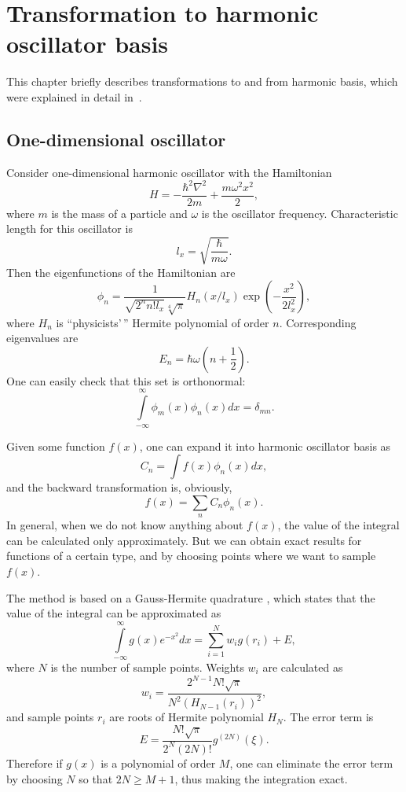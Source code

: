 \chapter{Transformation to harmonic oscillator basis}
\label{cha:appendix:harmonic-transform}


This chapter briefly describes transformations to and from harmonic basis,
which were explained in detail in~\cite{Dion2003}.


\section{One-dimensional oscillator}

Consider one-dimensional harmonic oscillator with the Hamiltonian
\[
	H = -\frac{\hbar^2 \nabla^2}{2 m} + \frac{m \omega^2 x^2}{2},
\]
where $m$ is the mass of a particle and $\omega$ is the oscillator frequency.
Characteristic length for this oscillator is
\[
	l_x = \sqrt{\frac{\hbar}{m \omega}}.
\]
Then the eigenfunctions of the Hamiltonian are
\begin{equation}
\label{eqn:harmonic-transform:harmonic-modes}
	\phi_n = \frac{1}{\sqrt{2^n n! l_x} \sqrt[4]{\pi}} H_n(x / l_x)
		\exp \left( -\frac{x^2}{2 l_x^2} \right),
\end{equation}
where $H_n$ is ``physicists'\,'' Hermite polynomial of order $n$.
Corresponding eigenvalues are
\[
	E_n = \hbar \omega (n + \frac{1}{2}).
\]
One can easily check that this set is orthonormal:
\[
	\int\limits_{-\infty}^{\infty} \phi_m(x) \phi_n(x) dx = \delta_{mn}.
\]

Given some function $f(x)$, one can expand it into harmonic oscillator basis as
\[
	C_n = \int f(x) \phi_n(x) dx,
\]
and the backward transformation is, obviously,
\[
	f(x) = \sum_{n} C_n \phi_n(x).
\]
In general, when we do not know anything about $f(x)$,
the value of the integral can be calculated only approximately.
But we can obtain exact results for functions of a certain type,
and by choosing points where we want to sample $f(x)$.

The method is based on a Gauss-Hermite quadrature ,
which states that the value of the integral can be approximated as
\[
	\int\limits_{-\infty}^{\infty} g(x) e^{-x^2} dx
	= \sum_{i=1}^N w_i g(r_i) + E,
\]
where $N$ is the number of sample points.
Weights $w_i$ are calculated as
\[
	w_i = \frac{2^{N-1} N! \sqrt{\pi}}{N^2 (H_{N-1}(r_i))^2},
\]
and sample points $r_i$ are roots of Hermite polynomial $H_N$.
The error term is
\[
	E = \frac{N! \sqrt{\pi}}{2^N (2N)!} g^{(2N)}(\xi).
\]
Therefore if $g(x)$ is a polynomial of order $M$,
one can eliminate the error term by choosing $N$ so that $2N \ge M + 1$,
thus making the integration exact.

